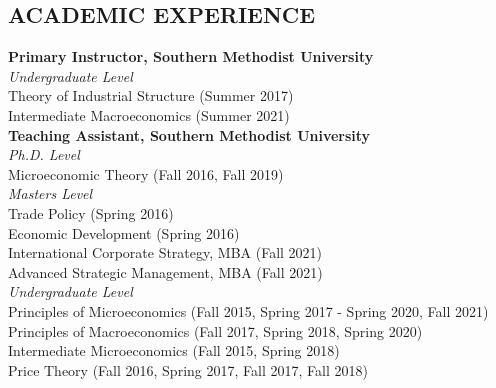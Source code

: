\documentclass[11pt]{res}
\begin{document}
\begin{resume}
\section{ACADEMIC EXPERIENCE}\vspace{3mm}
{\bf Primary Instructor, Southern Methodist University}\vspace{2mm}\\
\emph{Undergraduate Level}\vspace{1.5mm}\\
Theory of Industrial Structure (Summer 2017)\vspace{1.5mm}\\
Intermediate Macroeconomics (Summer 2021)\vspace{1.5mm}\\
{\bf Teaching Assistant, Southern Methodist University}\vspace{2mm}\\
\emph{Ph.D. Level}\vspace{1.5mm}\\
Microeconomic Theory (Fall 2016, Fall 2019)\vspace{1.5mm}\\
\emph{Masters Level}\vspace{1.5mm}\\
Trade Policy (Spring 2016)\vspace{1.5mm}\\
Economic Development (Spring 2016)\vspace{1.5mm}\\
International Corporate Strategy, MBA (Fall 2021)\vspace{1.5mm}\\
Advanced Strategic Management, MBA (Fall 2021)\vspace{1.5mm}\\
\emph{Undergraduate Level}\vspace{1.5mm}\\
Principles of Microeconomics  (Fall 2015, Spring 2017 - Spring 2020, Fall 2021)\vspace{1.5mm}\\
Principles of Macroeconomics (Fall 2017, Spring 2018, Spring 2020)\vspace{1.5mm}\\
Intermediate Microeconomics (Fall 2015, Spring 2018)\vspace{1.5mm}\\
Price Theory (Fall 2016, Spring 2017, Fall 2017, Fall 2018)\vspace{1.5mm}\\

\end{resume}
\end{document}
